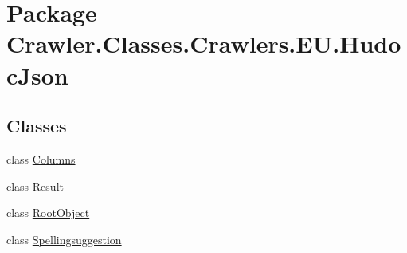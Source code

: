 \hypertarget{namespace_crawler_1_1_classes_1_1_crawlers_1_1_e_u_1_1_hudoc_json}{\section{Package Crawler.\-Classes.\-Crawlers.\-E\-U.\-Hudoc\-Json}
\label{namespace_crawler_1_1_classes_1_1_crawlers_1_1_e_u_1_1_hudoc_json}
}
\subsection*{Classes}
\begin{DoxyCompactItemize}
\item 
class \hyperlink{class_crawler_1_1_classes_1_1_crawlers_1_1_e_u_1_1_hudoc_json_1_1_columns}{Columns}
\item 
class \hyperlink{class_crawler_1_1_classes_1_1_crawlers_1_1_e_u_1_1_hudoc_json_1_1_result}{Result}
\item 
class \hyperlink{class_crawler_1_1_classes_1_1_crawlers_1_1_e_u_1_1_hudoc_json_1_1_root_object}{Root\-Object}
\item 
class \hyperlink{class_crawler_1_1_classes_1_1_crawlers_1_1_e_u_1_1_hudoc_json_1_1_spellingsuggestion}{Spellingsuggestion}
\end{DoxyCompactItemize}
